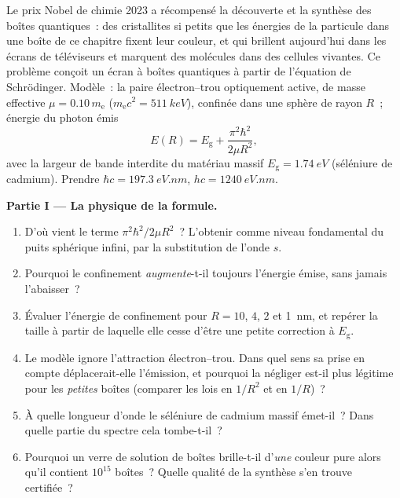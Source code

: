 \begin{problem}\label{pb:b3:schrodinger-three-dimensions:1}
Le prix Nobel de chimie 2023 a récompensé la découverte et la synthèse
des boîtes quantiques~: des cristallites si petits que les énergies de
la particule dans une boîte de ce chapitre fixent leur couleur, et qui
brillent aujourd'hui dans les écrans de téléviseurs et marquent des
molécules dans des cellules vivantes. Ce problème conçoit un écran à
boîtes quantiques à partir de l'équation de Schrödinger. Modèle~: la
paire électron--trou optiquement active, de masse effective
$\mu = 0.10\,m_{\text{e}}$ ($m_{\text{e}}c^2 = \qty{511}{keV}$),
confinée dans une sphère de rayon $R$~; énergie du photon émis
\[
E(R) = E_{\text{g}} + \frac{\pi^2\hbar^2}{2\mu R^2} ,
\]
avec la largeur de bande interdite du matériau massif
$E_{\text{g}} = \qty{1.74}{eV}$ (séléniure de cadmium). Prendre $\hbar c = \qty{197.3}{eV.nm}$, $hc =
\qty{1240}{eV.nm}$.

\medskip\noindent\textbf{Partie I --- La physique de la formule.}
\begin{enumerate}
  \item D'où vient le terme $\pi^2\hbar^2/2\mu R^2$~? L'obtenir comme
        niveau fondamental du puits sphérique infini, par la
        substitution de l'onde $s$.
  \item Pourquoi le confinement \emph{augmente}-t-il toujours l'énergie
        émise, sans jamais l'abaisser~?
  \item Évaluer l'énergie de confinement pour $R = 10$, $4$, $2$ et
        \qty{1}{nm}, et repérer la taille à partir de laquelle elle
        cesse d'être une petite correction à $E_{\text{g}}$.
  \item Le modèle ignore l'attraction électron--trou. Dans quel sens sa
        prise en compte déplacerait-elle l'émission, et pourquoi la
        négliger est-il plus légitime pour les \emph{petites} boîtes
        (comparer les lois en $1/R^2$ et en $1/R$)~?
  \item À quelle longueur d'onde le séléniure de cadmium massif
        émet-il~? Dans quelle partie du spectre cela tombe-t-il~?
  \item Pourquoi un verre de solution de boîtes brille-t-il d'\emph{une}
        couleur pure alors qu'il contient $10^{15}$ boîtes~? Quelle
        qualité de la synthèse s'en trouve certifiée~?
\end{enumerate}


\end{problem}
